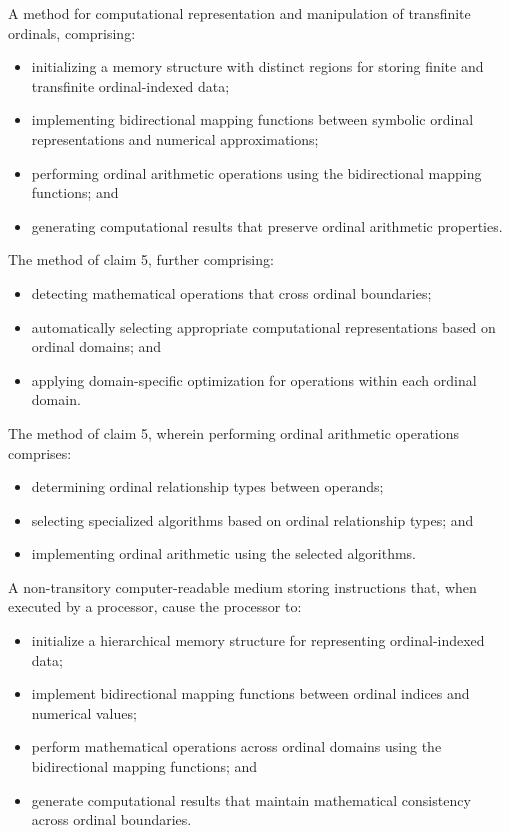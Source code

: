 \documentclass[12pt,letterpaper]{article}
\begin{document}
\begin{patentclaims}
    \item A method for computational representation and manipulation of transfinite ordinals, comprising:
    \begin{itemize}[leftmargin=2em]
        \item initializing a memory structure with distinct regions for storing finite and transfinite ordinal-indexed data;
        \item implementing bidirectional mapping functions between symbolic ordinal representations and numerical approximations;
        \item performing ordinal arithmetic operations using the bidirectional mapping functions; and
        \item generating computational results that preserve ordinal arithmetic properties.
    \end{itemize}
    
    \item The method of claim 5, further comprising:
    \begin{itemize}[leftmargin=2em]
        \item detecting mathematical operations that cross ordinal boundaries;
        \item automatically selecting appropriate computational representations based on ordinal domains; and
        \item applying domain-specific optimization for operations within each ordinal domain.
    \end{itemize}
    
    \item The method of claim 5, wherein performing ordinal arithmetic operations comprises:
    \begin{itemize}[leftmargin=2em]
        \item determining ordinal relationship types between operands;
        \item selecting specialized algorithms based on ordinal relationship types; and
        \item implementing ordinal arithmetic using the selected algorithms.
    \end{itemize}
    
    \item A non-transitory computer-readable medium storing instructions that, when executed by a processor, cause the processor to:
    \begin{itemize}[leftmargin=2em]
        \item initialize a hierarchical memory structure for representing ordinal-indexed data;
        \item implement bidirectional mapping functions between ordinal indices and numerical values;
        \item perform mathematical operations across ordinal domains using the bidirectional mapping functions; and
        \item generate computational results that maintain mathematical consistency across ordinal boundaries.
    \end{itemize}
    

\end{patentclaims}
\end{document}
